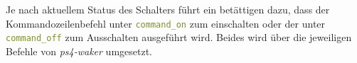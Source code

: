 

Je nach aktuellem Status des Schalters führt ein betättigen dazu, dass der Kommandozeilenbefehl unter \lstinline[language=yaml]{command_on} zum einschalten
oder der unter \lstinline[language=yaml]{command_off} zum Ausschalten ausgeführt wird.
Beides wird über die jeweiligen Befehle von \textit{ps4-waker} umgesetzt.